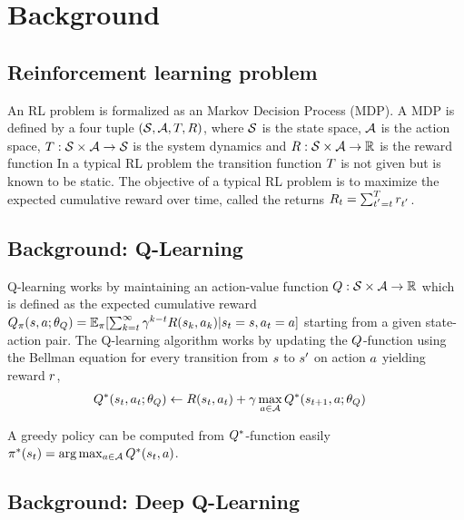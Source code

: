 \section{Background}

\subsection{Reinforcement learning problem}

An RL problem is formalized as an Markov Decision Process (MDP). A MDP is
defined by a four tuple $(\mathcal{S}, \mathcal{A}, T, R)$, where $\mathcal{S}$ is the
state space, $\mathcal{A}$ is the action space, $T : \mathcal{S} \times \mathcal{A}
\rightarrow \mathcal{S}$ is the system dynamics and $R : \mathcal{S} \times \mathcal{A}
\rightarrow \mathbb{R} $ is the reward function
In a typical RL problem the transition function $T$ is not given but is
known to be static.
The objective of a typical RL problem is to maximize the expected cumulative
reward over time, called the returns  $R_t = \sum_{t^{'}=t}^{T} r_{t^{'}}$.


\subsection{Background: Q-Learning}

Q-learning works by maintaining an action-value function $Q : \mathcal{S} \times
\mathcal{A} \rightarrow \mathbb{R}$ which is defined as the expected cumulative reward
  $Q_\pi(s, a; \theta_Q) = \mathbb{E}_\pi[ \sum_{k=t}^\infty
  \gamma^{k-t} R(s_k, a_k) | s_t = s, a_t = a ]$
  starting from a given state-action pair.
The Q-learning algorithm works by updating the $Q$-function using the Bellman
equation for every transition from $s$ to $s'$ on action $a$
yielding reward $r$, 
%
\begin{align}
Q^*(s_t, a_t; \theta_Q) &\leftarrow R(s_t, a_t) + \gamma \max_{a \in \mathcal{A}} Q^*(s_{t+1}, a; \theta_Q)
                                    \label{eq:bellman}
\end{align}

A greedy policy can be computed from $Q^*$-function easily $\pi^*(s_t) = \arg \max_{a \in \mathcal{A}} Q^*(s_t, a)$.

\subsection{Background: Deep Q-Learning}


